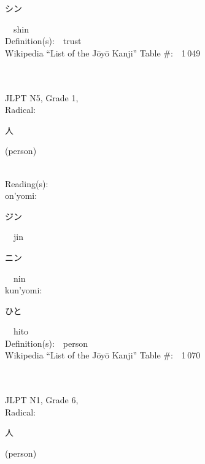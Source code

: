 \begin{multicols}{2}
{\hspace*{2em}}{\begin{CJK}{UTF8}{min} シン \end{CJK}}\ \ shin\ \ \\
Definition(s):\ \ trust \\
Wikipedia ``List of the J\=oy\=o Kanji'' Table \#:\ \ 1\,049 \\
\ \ \\
{\fontsize{34pt}{40pt}  }\ \ \\  %
{JLPT N5, Grade 1, \\Radical:\ \ {\begin{CJK}{UTF8}{min} 人 \end{CJK}} (person) } \\
Reading(s):\ \ \\
{\hspace*{1em}}on'yomi:\ \ \\
{\hspace*{2em}}{\begin{CJK}{UTF8}{min} ジン \end{CJK}}\ \ jin\ \ \\
{\hspace*{2em}}{\begin{CJK}{UTF8}{min} ニン \end{CJK}}\ \ nin\ \ \\
{\hspace*{1em}}kun'yomi:\ \ \\
{\hspace*{2em}}{\begin{CJK}{UTF8}{min} ひと \end{CJK}}\ \ hito\ \ \\
Definition(s):\ \ person \\
Wikipedia ``List of the J\=oy\=o Kanji'' Table \#:\ \ 1\,070 \\
\ \ \\
{\fontsize{34pt}{40pt}  }\ \ \\  %
{JLPT N1, Grade 6, \\Radical:\ \ {\begin{CJK}{UTF8}{min} 人 \end{CJK}} (person) } \\

\end{multicols}
